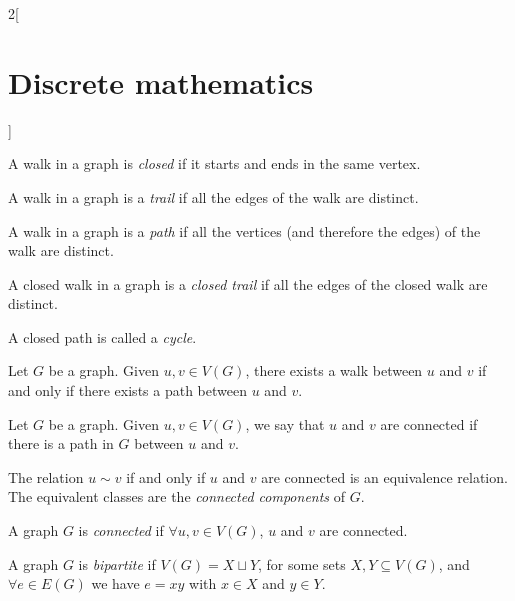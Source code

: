 \documentclass[../../../main_math.tex]{subfiles}
\begin{document}
\begin{multicols}{2}[\section{Discrete mathematics}]
\begin{definition}
  \end{definition}
  \begin{definition}
    A walk in a graph is \emph{closed} if it starts and ends in the same vertex.
  \end{definition}
  \begin{definition}
    A walk in a graph is a \emph{trail} if all the edges of the walk are distinct.
  \end{definition}
  \begin{definition}
    A walk in a graph is a \emph{path} if all the vertices (and therefore the edges) of the walk are distinct.
  \end{definition}
  \begin{definition}
    A closed walk in a graph is a \emph{closed trail} if all the edges of the closed walk are distinct.
  \end{definition}
  \begin{definition}
    A closed path is called a \emph{cycle}.
  \end{definition}
  \begin{proposition}
    Let $G$ be a graph. Given $u,v\in V(G)$, there exists a walk between $u$ and $v$ if and only if there exists a path between $u$ and $v$.
  \end{proposition}
  \begin{definition}
    Let $G$ be a graph. Given $u,v\in V(G)$, we say that $u$ and $v$ are connected if there is a path in $G$ between $u$ and $v$.
  \end{definition}
  \begin{proposition}
    The relation $u\sim v$ if and only if $u$ and $v$ are connected is an equivalence relation. The equivalent classes are the \emph{connected components} of $G$.
  \end{proposition}
  \begin{definition}
    A graph $G$ is \emph{connected} if $\forall u,v\in V(G)$, $u$ and $v$ are connected.
  \end{definition}
  \begin{definition}
    A graph $G$ is \emph{bipartite} if $V(G)=X\sqcup Y$, for some sets $X,Y\subseteq V(G)$, and $\forall e\in E(G)$ we have $e=xy$ with $x\in X$ and $y\in Y$.
  \end{definition}
  \begin{center}
    \begin{minipage}{\linewidth}
      \centering
      

\end{minipage}
\end{center}
\end{multicols}
\end{document}
